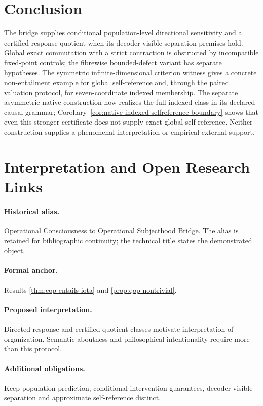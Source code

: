 \documentclass[11pt,a4paper]{article}
\theoremstyle{definition}
\begin{document}
\section{Conclusion}

The bridge supplies conditional population-level directional sensitivity and a certified response quotient when its decoder-visible separation premises hold. Global exact commutation with a strict contraction is obstructed by incompatible fixed-point controls; the fibrewise bounded-defect variant has separate hypotheses. The symmetric infinite-dimensional criterion witness gives a concrete non-entailment example for global self-reference and, through the paired valuation protocol, for seven-coordinate indexed membership. The separate asymmetric native construction now realizes the full indexed class in its declared causal grammar; Corollary~\ref{cor:native-indexed-selfreference-boundary} shows that even this stronger certificate does not supply exact global self-reference. Neither construction supplies a phenomenal interpretation or empirical external support.

\section{Interpretation and Open Research Links}\label{sec:interpretation-open-links}
\paragraph{Historical alias.} Operational Consciousness to Operational Subjecthood Bridge. The alias is retained for bibliographic continuity; the technical title states the demonstrated object.

\paragraph{Formal anchor.} Results \ref{thm:cop-entails-iota} and \ref{prop:qop-nontrivial}.

\paragraph{Proposed interpretation.} Directed response and certified quotient classes motivate interpretation of organization. Semantic aboutness and philosophical intentionality require more than this protocol.

\paragraph{Additional obligations.} Keep population prediction, conditional intervention guarantees, decoder-visible separation and approximate self-reference distinct.
\end{document}
